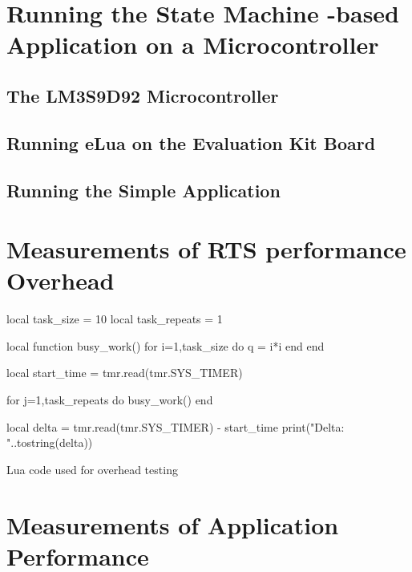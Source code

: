 \section{Running the State Machine -based Application on a Microcontroller}
\label{sec:running_on_micro}

\subsection{The LM3S9D92 Microcontroller}

\subsection{Running eLua on the Evaluation Kit Board}

\subsection{Running the Simple Application}

\section{Measurements of RTS performance Overhead}
\label{sec:overhead_measure}

\begin{listing}[H]
\begin{luacode}
local task_size = 10
local task_repeats = 1

local function busy_work()
	for i=1,task_size do
		q = i*i
	end
end

local start_time = tmr.read(tmr.SYS_TIMER)

for j=1,task_repeats do
	busy_work()
end

local delta = tmr.read(tmr.SYS_TIMER) - start_time
print("Delta: "..tostring(delta))
\end{luacode}
	\caption{Lua code used for overhead testing}
	\label{code:overhead}
\end{listing}

\section{Measurements of Application Performance}
\label{sec:performance_measure}

